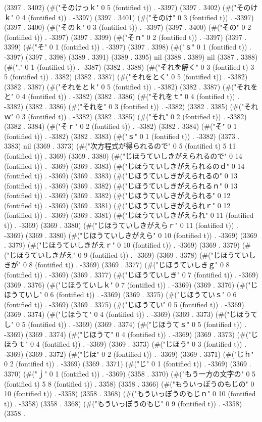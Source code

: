 (3397 . 3402) (#("そのけっｋ" 0 5 (fontified t)) . -3397) (3397 . 3402) (#("そのけｋ" 0 4 (fontified t)) . -3397) (3397 . 3401) (#("そのけ" 0 3 (fontified t)) . -3397) (3397 . 3400) (#("そのｋ" 0 3 (fontified t)) . -3397) (3397 . 3400) (#("その" 0 2 (fontified t)) . -3397) (3397 . 3399) (#("そｎ" 0 2 (fontified t)) . -3397) (3397 . 3399) (#("そ" 0 1 (fontified t)) . -3397) (3397 . 3398) (#("ｓ" 0 1 (fontified t)) . -3397) (3397 . 3398) (3389 . 3391) (3389 . 3395) nil (3388 . 3389) nil (3387 . 3388) (#("." 0 1 (fontified t)) . -3387) (3382 . 3388) (#("それを解く" 0 3 (fontified t) 3 5 (fontified t)) . 3382) (3382 . 3387) (#("それをとく" 0 5 (fontified t)) . -3382) (3382 . 3387) (#("それをとｋ" 0 5 (fontified t)) . -3382) (3382 . 3387) (#("それをと" 0 4 (fontified t)) . -3382) (3382 . 3386) (#("それをｔ" 0 4 (fontified t)) . -3382) (3382 . 3386) (#("それを" 0 3 (fontified t)) . -3382) (3382 . 3385) (#("それｗ" 0 3 (fontified t)) . -3382) (3382 . 3385) (#("それ" 0 2 (fontified t)) . -3382) (3382 . 3384) (#("そｒ" 0 2 (fontified t)) . -3382) (3382 . 3384) (#("そ" 0 1 (fontified t)) . -3382) (3382 . 3383) (#("ｓ" 0 1 (fontified t)) . -3382) (3373 . 3383) nil (3369 . 3373) (#("次方程式が得られるので" 0 5 (fontified t) 5 11 (fontified t)) . 3369) (3369 . 3380) (#("じほうていしきがえられるので" 0 14 (fontified t)) . -3369) (3369 . 3383) (#("じほうていしきがえられるのｄ" 0 14 (fontified t)) . -3369) (3369 . 3383) (#("じほうていしきがえられるの" 0 13 (fontified t)) . -3369) (3369 . 3382) (#("じほうていしきがえられるｎ" 0 13 (fontified t)) . -3369) (3369 . 3382) (#("じほうていしきがえられる" 0 12 (fontified t)) . -3369) (3369 . 3381) (#("じほうていしきがえられｒ" 0 12 (fontified t)) . -3369) (3369 . 3381) (#("じほうていしきがえられ" 0 11 (fontified t)) . -3369) (3369 . 3380) (#("じほうていしきがえらｒ" 0 11 (fontified t)) . -3369) (3369 . 3380) (#("じほうていしきがえら" 0 10 (fontified t)) . -3369) (3369 . 3379) (#("じほうていしきがえｒ" 0 10 (fontified t)) . -3369) (3369 . 3379) (#("じほうていしきがえ" 0 9 (fontified t)) . -3369) (3369 . 3378) (#("じほうていしきが" 0 8 (fontified t)) . -3369) (3369 . 3377) (#("じほうていしきｇ" 0 8 (fontified t)) . -3369) (3369 . 3377) (#("じほうていしき" 0 7 (fontified t)) . -3369) (3369 . 3376) (#("じほうていしｋ" 0 7 (fontified t)) . -3369) (3369 . 3376) (#("じほうていし" 0 6 (fontified t)) . -3369) (3369 . 3375) (#("じほうていｓ" 0 6 (fontified t)) . -3369) (3369 . 3375) (#("じほうてい" 0 5 (fontified t)) . -3369) (3369 . 3374) (#("じほうて" 0 4 (fontified t)) . -3369) (3369 . 3373) (#("じほうてし" 0 5 (fontified t)) . -3369) (3369 . 3374) (#("じほうてｓ" 0 5 (fontified t)) . -3369) (3369 . 3374) (#("じほうて" 0 4 (fontified t)) . -3369) (3369 . 3373) (#("じほうｔ" 0 4 (fontified t)) . -3369) (3369 . 3373) (#("じほう" 0 3 (fontified t)) . -3369) (3369 . 3372) (#("じほ" 0 2 (fontified t)) . -3369) (3369 . 3371) (#("じｈ" 0 2 (fontified t)) . -3369) (3369 . 3371) (#("じ" 0 1 (fontified t)) . -3369) (3369 . 3370) (#("ｊ" 0 1 (fontified t)) . -3369) (3358 . 3370) (#("もう一方の文字の" 0 5 (fontified t) 5 8 (fontified t)) . 3358) (3358 . 3366) (#("もういっぽうのもじの" 0 10 (fontified t)) . -3358) (3358 . 3368) (#("もういっぽうのもじｎ" 0 10 (fontified t)) . -3358) (3358 . 3368) (#("もういっぽうのもじ" 0 9 (fontified t)) . -3358) (3358 . 